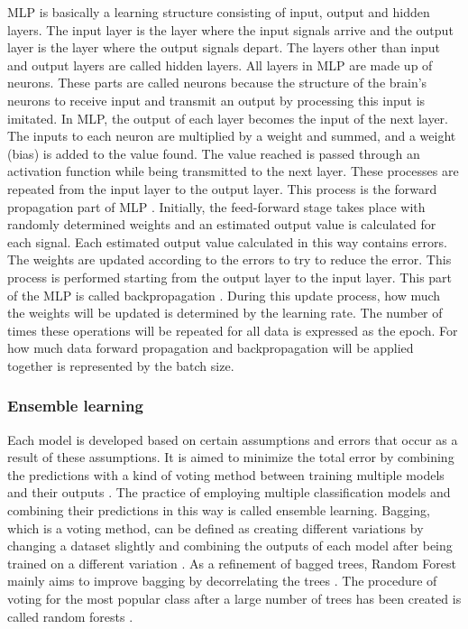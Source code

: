 MLP is basically a learning structure consisting of input, output and hidden layers. The input layer is the layer where the input signals arrive and the output layer is the layer where the output signals depart. The layers other than input and output layers are called hidden layers. All layers in MLP are made up of neurons. These parts are called neurons because the structure of the brain's neurons to receive input and transmit an output by processing this input is imitated. In MLP, the output of each layer becomes the input of the next layer. The inputs to each neuron are multiplied by a weight and summed, and a weight (bias) is added to the value found. The value reached is passed through an activation function while being transmitted to the next layer. These processes are repeated from the input layer to the output layer. This process is the forward propagation part of MLP \cite{haykin2010neural}. Initially, the feed-forward stage takes place with randomly determined weights and an estimated output value is calculated for each signal. Each estimated output value calculated in this way contains errors. The weights are updated according to the errors to try to reduce the error. This process is performed starting from the output layer to the input layer. This part of the MLP is called backpropagation \cite{haykin2010neural}. During this update process, how much the weights will be updated is determined by the learning rate. The number of times these operations will be repeated for all data is expressed as the epoch. For how much data forward propagation and backpropagation will be applied together is represented by the batch size.

\subsubsection{Ensemble learning}
Each model is developed based on certain assumptions and errors that occur as a result of these assumptions. It is aimed to minimize the total error by combining the predictions with a kind of voting method between training multiple models and their outputs \cite{alpaydin2020introduction,sewell2011ensemble}. The practice of employing multiple classification models and combining their predictions in this way is called ensemble learning.
Bagging, which is a voting method, can be defined as creating different variations by changing a dataset slightly and combining the outputs of each model after being trained on a different variation \cite{alpaydin2020introduction,sewell2011ensemble}. As a refinement of bagged trees, Random Forest mainly aims to improve bagging by decorrelating the trees \cite{breiman2001random}. The procedure of voting for the most popular class after a large number of trees has been created is called random forests \cite{breiman2001random}.

